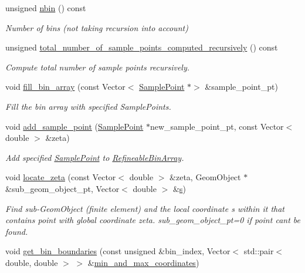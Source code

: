 \begin{DoxyCompactItemize}
unsigned \hyperlink{classRefineableBinArray_a5975657726af982a4d67ff6470abb9d1}{nbin} () const
\begin{DoxyCompactList}\small\item\em Number of bins (not taking recursion into account) \end{DoxyCompactList}\item 
unsigned \hyperlink{classRefineableBinArray_a267d58bd06dafc53aff7b42927500a8b}{total\+\_\+number\+\_\+of\+\_\+sample\+\_\+points\+\_\+computed\+\_\+recursively} () const
\begin{DoxyCompactList}\small\item\em Compute total number of sample points recursively. \end{DoxyCompactList}\item 
void \hyperlink{classRefineableBinArray_a8697312039bc33ac77d55545563b5597}{fill\+\_\+bin\+\_\+array} (const Vector$<$ \hyperlink{classSamplePoint}{Sample\+Point} $\ast$$>$ \&sample\+\_\+point\+\_\+pt)
\begin{DoxyCompactList}\small\item\em Fill the bin array with specified Sample\+Points. \end{DoxyCompactList}\item 
void \hyperlink{classRefineableBinArray_a477a68e97b7cb297d38a0b2a844f53a5}{add\+\_\+sample\+\_\+point} (\hyperlink{classSamplePoint}{Sample\+Point} $\ast$new\+\_\+sample\+\_\+point\+\_\+pt, const Vector$<$ double $>$ \&zeta)
\begin{DoxyCompactList}\small\item\em Add specified \hyperlink{classSamplePoint}{Sample\+Point} to \hyperlink{classRefineableBinArray}{Refineable\+Bin\+Array}. \end{DoxyCompactList}\item 
void \hyperlink{classRefineableBinArray_a4f2f78efe9b05fda23d94e857d00cfa1}{locate\+\_\+zeta} (const Vector$<$ double $>$ \&zeta, Geom\+Object $\ast$\&sub\+\_\+geom\+\_\+object\+\_\+pt, Vector$<$ double $>$ \&\hyperlink{cfortran_8h_ab7123126e4885ef647dd9c6e3807a21c}{s})
\begin{DoxyCompactList}\small\item\em Find sub-\/\+Geom\+Object (finite element) and the local coordinate s within it that contains point with global coordinate zeta. sub\+\_\+geom\+\_\+object\+\_\+pt=0 if point can\textquotesingle{}t be found. \end{DoxyCompactList}\item 
void \hyperlink{classRefineableBinArray_aaf7e968daa598e460269fac55dfb55ca}{get\+\_\+bin\+\_\+boundaries} (const unsigned \&bin\+\_\+index, Vector$<$ std\+::pair$<$ double, double $>$ $>$ \&\hyperlink{classSamplePointContainer_a6799027f7c569176934457b17bfddf0f}{min\+\_\+and\+\_\+max\+\_\+coordinates})
$$
\end{DoxyCompactItemize}
